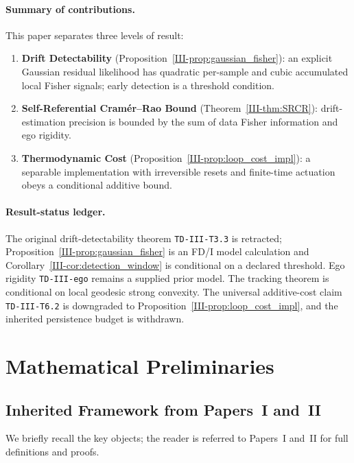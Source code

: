 \documentclass[12pt,a4paper,openany]{book}
\begin{document}
\paragraph{Summary of contributions.}
This paper separates three levels of result:
\begin{enumerate}
\item \textbf{Drift Detectability}
  (Proposition~\ref{III-prop:gaussian_fisher}): an explicit Gaussian
  residual likelihood has quadratic per-sample and cubic accumulated
  local Fisher signals; early detection is a threshold condition.
\item \textbf{Self-Referential Cram\'{e}r--Rao Bound}
  (Theorem~\ref{III-thm:SRCR}):
  drift-estimation precision is bounded by the sum of
  data Fisher information and ego rigidity.
\item \textbf{Thermodynamic Cost}
  (Proposition~\ref{III-prop:loop_cost_impl}): a separable implementation
  with irreversible resets and finite-time actuation obeys a conditional
  additive bound.
\end{enumerate}

\paragraph{Result-status ledger.}
The original drift-detectability theorem
\texttt{TD-III-T3.3} is retracted;
Proposition~\ref{III-prop:gaussian_fisher} is an FD/I model calculation and
Corollary~\ref{III-cor:detection_window} is conditional on a declared
threshold.  Ego rigidity \texttt{TD-III-ego} remains a supplied prior
model.  The tracking theorem is conditional on local geodesic strong
convexity.  The universal additive-cost claim
\texttt{TD-III-T6.2} is downgraded to
Proposition~\ref{III-prop:loop_cost_impl}, and the inherited persistence
budget is withdrawn.

\section{Mathematical Preliminaries}
\label{III-sec:prelim}

\subsection{Inherited Framework from Papers~I and~II}
\label{III-subsec:inherited}

We briefly recall the key objects; the reader is referred to
Papers~I and~II for full definitions and proofs.
\end{document}
